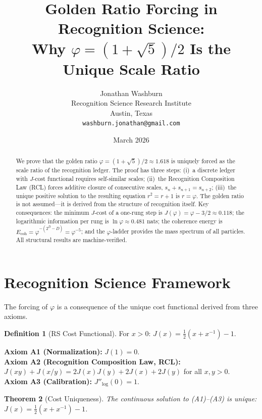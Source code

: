 \documentclass[12pt,a4paper]{article}
\title{Golden Ratio Forcing in Recognition Science:\\
Why $\varphi = (1+\sqrt{5})/2$ Is the Unique Scale Ratio}
\author{Jonathan Washburn\\
Recognition Science Research Institute\\
Austin, Texas\\
\texttt{washburn.jonathan@gmail.com}}
\date{March 2026}
\newtheorem{theorem}{Theorem}[section]
\theoremstyle{definition}
\newtheorem{definition}[theorem]{Definition}
\theoremstyle{remark}
\begin{document}
\maketitle

\begin{abstract}
We prove that the golden ratio
$\varphi = (1 + \sqrt{5})/2 \approx 1.618$ is uniquely forced as
the scale ratio of the recognition ledger.  The proof has three
steps: (i)~a discrete ledger with $J$-cost functional requires
self-similar scales; (ii)~the Recognition Composition Law (RCL)
forces additive closure of consecutive scales,
$s_n + s_{n+1} = s_{n+2}$; (iii)~the unique positive solution to
the resulting equation $r^2 = r + 1$ is $r = \varphi$.  The golden
ratio is not assumed---it is derived from the structure of
recognition itself.  Key consequences: the minimum $J$-cost of a
one-rung step is $J(\varphi) = \varphi - 3/2 \approx 0.118$;
the logarithmic information per rung is $\ln\varphi \approx 0.481$
nats; the coherence energy is
$E_{\mathrm{coh}} = \varphi^{-(2^D-D)} = \varphi^{-5}$; and the
$\varphi$-ladder provides the mass spectrum of all particles.
All structural results are machine-verified.
\end{abstract}

\section{Recognition Science Framework}
\label{sec:framework}

The forcing of $\varphi$ is a consequence of the unique cost
functional derived from three axioms.

\begin{definition}[RS Cost Functional]
For $x > 0$: $J(x) = \tfrac{1}{2}(x + x^{-1}) - 1$.
\end{definition}

\noindent\textbf{Axiom A1 (Normalization):} $J(1) = 0$.\\
\textbf{Axiom A2 (Recognition Composition Law, RCL):}
$J(xy)+J(x/y)=2J(x)J(y)+2J(x)+2J(y)$ for all $x,y>0$.\\
\textbf{Axiom A3 (Calibration):} $J''_{\log}(0) = 1$.

\begin{theorem}[Cost Uniqueness]
\label{thm:cost-unique}
The continuous solution to \textup{(A1)--(A3)} is unique:
$J(x) = \tfrac{1}{2}(x + x^{-1}) - 1$.
\end{theorem}
\end{document}
